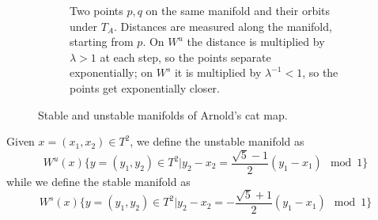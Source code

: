 \begin{figure}[ht]
\begin{subfigure}[t]{\textwidth}
        \caption{Two points $p,q$ on the same manifold and their orbits under $T_A$. Distances are measured
        along the manifold, starting from $p$. On $W^u$ the distance is multiplied by $\lambda>1$ at each
        step, so the points separate exponentially; on $W^s$ it is multiplied by $\lambda^{-1}<1$, so the
        points get exponentially closer.}
        \label{fig:cat_manifolds_b}
    \end{subfigure}

    \caption{Stable and unstable manifolds of Arnold's cat map.}
    \label{fig:cat_manifolds}
\end{figure}

\begin{definition}
    Given $x=(x_1, x_2)\in T^2$, we define the unstable manifold as \begin{equation*}
    W^u(x)\{y=(y_1, y_2)\in T^2| y_2-x_2=\frac{\sqrt{5}-1}{2}(y_1-x_1) \mod 1\}
    \end{equation*}
    while we define the stable manifold as \begin{equation*}
        W^s(x)\{y=(y_1, y_2)\in T^2| y_2-x_2=-\frac{\sqrt{5}+1}{2}(y_1-x_1) \mod 1\}
    \end{equation*}
\end{definition}

